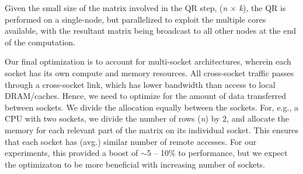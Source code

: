 Given the small size of the matrix involved in the QR step,
({\it{n}} $\times$ {\it{k}}), the QR is performed on a single-node, but
parallelized to exploit the multiple cores available, with the resultant matrix
being broadcast to all other nodes at the end of the computation.

Our final optimization is to account for multi-socket architectures, wherein
each socket has its own compute and memory resources. All cross-socket traffic
passes through a cross-socket link, which has lower bandwidth than access to
local DRAM/caches. Hence, we need to optimize for the amount of data
transferred between sockets. We divide the allocation equally between the
sockets. For, e.g., a CPU with two sockets, we divide the number of rows ({\it{n}}) by 2, and
allocate the memory for each relevant part of the matrix on its individual
socket. This ensures that each socket has (avg.) similar number of remote
accesses. For our experiments, this provided a boost of $\sim$5 -- 10\% to
performance, but we expect the optimizaton to be more beneficial with
increasing number of sockets.




